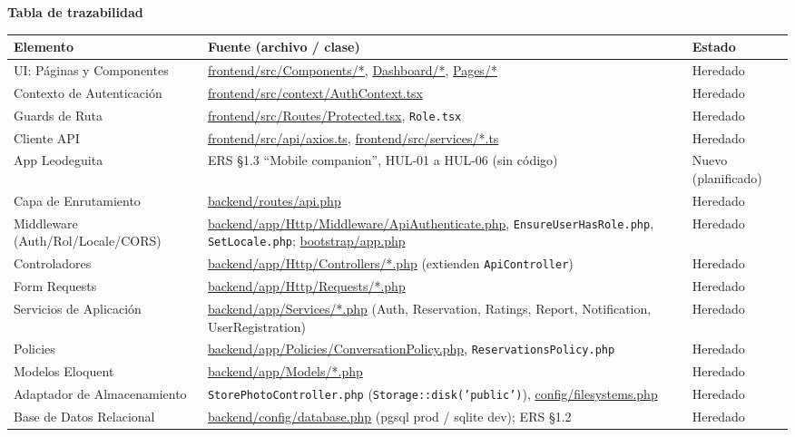 \bigskip
\noindent\textbf{Tabla de trazabilidad}
\begin{longtable}{|L{6cm}|L{6.5cm}|M{2cm}|}
\hline
{} \textbf{Elemento} & \textbf{Fuente (archivo / clase)} & \textbf{Estado} \\ \hline
\endhead
UI: Páginas y Componentes & \url{frontend/src/Components/*}, \url{Dashboard/*}, \url{Pages/*} & Heredado \\ \hline
Contexto de Autenticación & \url{frontend/src/context/AuthContext.tsx} & Heredado \\ \hline
Guards de Ruta & \url{frontend/src/Routes/Protected.tsx}, \texttt{Role.tsx} & Heredado \\ \hline
Cliente API & \url{frontend/src/api/axios.ts}, \url{frontend/src/services/*.ts} & Heredado \\ \hline
App Leodeguita & ERS \S1.3 ``Mobile companion'', HUL-01 a HUL-06 (sin código) & Nuevo (planificado) \\ \hline
Capa de Enrutamiento & \url{backend/routes/api.php} & Heredado \\ \hline
Middleware (Auth/Rol/Locale/CORS) & \url{backend/app/Http/Middleware/ApiAuthenticate.php}, \texttt{EnsureUserHasRole.php}, \texttt{SetLocale.php}; \url{bootstrap/app.php} & Heredado \\ \hline
Controladores & \url{backend/app/Http/Controllers/*.php} (extienden \texttt{ApiController}) & Heredado \\ \hline
Form Requests & \url{backend/app/Http/Requests/*.php} & Heredado \\ \hline
Servicios de Aplicación & \url{backend/app/Services/*.php} (Auth, Reservation, Ratings, Report, Notification, UserRegistration) & Heredado \\ \hline
Policies & \url{backend/app/Policies/ConversationPolicy.php}, \texttt{ReservationsPolicy.php} & Heredado \\ \hline
Modelos Eloquent & \url{backend/app/Models/*.php} & Heredado \\ \hline
Adaptador de Almacenamiento & \texttt{StorePhotoController.php} (\texttt{Storage::disk('public')}), \url{config/filesystems.php} & Heredado \\ \hline
Base de Datos Relacional & \url{backend/config/database.php} (pgsql prod / sqlite dev); ERS \S1.2 & Heredado \\ \hline

\end{longtable}
